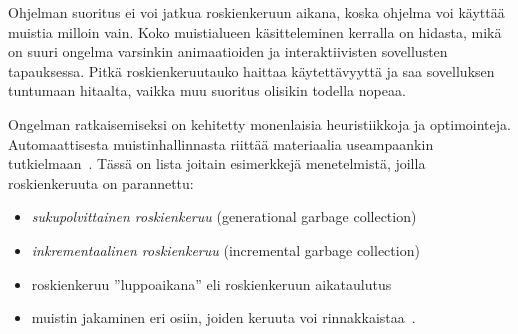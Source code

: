 Ohjelman suoritus ei voi jatkua roskienkeruun aikana, koska ohjelma voi käyttää muistia milloin vain. Koko muistialueen käsitteleminen kerralla on hidasta, mikä on suuri ongelma varsinkin animaatioiden ja interaktiivisten sovellusten tapauksessa. Pitkä roskienkeruutauko haittaa käytettävyyttä ja saa sovelluksen tuntumaan hitaalta, vaikka muu suoritus olisikin todella nopeaa.

Ongelman ratkaisemiseksi on kehitetty monenlaisia heuristiikkoja ja optimointeja. Automaattisesta muistinhallinnasta riittää materiaalia useampaankin tutkielmaan~\cite{gcbib}. Tässä on lista joitain esimerkkejä menetelmistä, joilla roskienkeruuta on parannettu:


\begin{itemize}
\item \textit{sukupolvittainen roskienkeruu} (generational garbage collection)~\cite{v8design}
\item \textit{inkrementaalinen roskienkeruu} (incremental garbage collection)~\cite{incrementalgc}
\item roskienkeruu ''luppoaikana'' eli roskienkeruun aikataulutus~\cite{freegc}
\item muistin jakaminen eri osiin, joiden keruuta voi rinnakkaistaa~\cite{ie10}.
\end{itemize}
